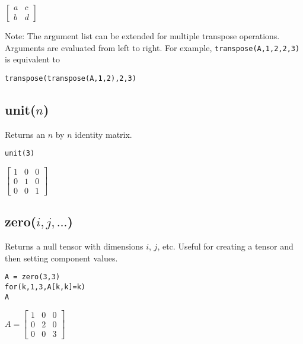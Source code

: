 \noindent
$\displaystyle
\begin{bmatrix}
a & c
\\[1ex]
b & d
\end{bmatrix}
$

\bigskip
\noindent
Note:
The argument list can be extended for multiple transpose operations.
Arguments are evaluated from left to right.
For example,
\verb$transpose(A,1,2,2,3)$
is equivalent to

\noindent
\verb$transpose(transpose(A,1,2),2,3)$

\subsection*{unit($n$)}

Returns an $n$ by $n$ identity matrix.

{\color{blue}
\begin{verbatim}
unit(3)
\end{verbatim}
}

\noindent
$\displaystyle
\begin{bmatrix}
1 & 0 & 0
\\[1ex]
0 & 1 & 0
\\[1ex]
0 & 0 & 1
\end{bmatrix}
$

\subsection*{zero($i,j,\ldots$)}

Returns a null tensor with dimensions $i$, $j$, etc.
Useful for creating a tensor and then setting component values.

{\color{blue}
\begin{verbatim}
A = zero(3,3)
for(k,1,3,A[k,k]=k)
A
\end{verbatim}
}

\noindent
$\displaystyle
A=
\begin{bmatrix}
1 & 0 & 0
\\[1ex]
0 & 2 & 0
\\[1ex]
0 & 0 & 3
\end{bmatrix}
$
